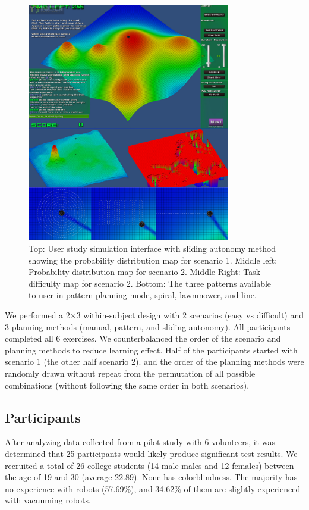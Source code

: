 \documentclass[journal]{IEEEtran}
\begin{document}
\begin{figure}
\centering
\includegraphics[width=3.5in]{UserStudy.JPG}
\caption{Top: User study simulation interface with sliding autonomy method showing the probability distribution map for scenario 1. Middle left: Probability distribution map for scenario 2. Middle Right: Task-difficulty map for scenario 2. Bottom: The three patterns available to user in pattern planning mode, spiral, lawnmower, and line.}
\label{UserStudy}
\end{figure}

We performed a 2$\times$3 within-subject design with 2 scenarios (easy vs difficult) and 3 planning methods (manual, pattern, and sliding autonomy). All participants completed all 6 exercises. We counterbalanced the order of the scenario and planning methods to reduce learning effect. Half of the participants started with scenario 1 (the other half scenario 2). and the order of the planning methods were randomly drawn without repeat from the permutation of all possible combinations (without following the same order in both scenarios).

\subsection{Participants}

After analyzing data collected from a pilot study with 6 volunteers, it was determined that 25 participants would likely produce significant test results. We recruited a total of 26 college students (14 male males and 12 females) between the age of 19 and 30 (average 22.89). None has colorblindness. The majority has no experience with robots (57.69\%), and 34.62\% of them are slightly experienced with vacuuming robots.
\end{document}

